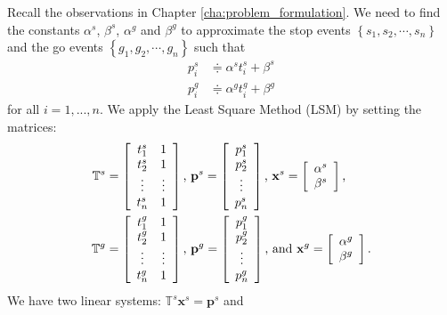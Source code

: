 \documentclass[final,oneside,onecolumn,12pt,a4paper]{book}%
\begin{document}
Recall the observations in Chapter \ref{cha:problem_formulation}. We need to
find the constants $\alpha^{s}$, $\beta^{s}$, $\alpha^{g}$ and $\beta^{g}$ to
approximate the stop events $\left\{  s_{1},s_{2},\cdots,s_{n}\right\}  $ and
the go events $\left\{  g_{1},g_{2},\cdots,g_{n}\right\}  $ such that%
\begin{align*}
p_{i}^{s}  &  \doteqdot\alpha^{s}t_{i}^{s}+\beta^{s}\\
p_{i}^{g}  &  \doteqdot\alpha^{g}t_{i}^{g}+\beta^{g}%
\end{align*}
for all $i=1,...,n$. We apply the Least Square Method (LSM) by setting the
matrices:
\begin{align*}
\mathbb{T}^{s}  &  =\left[
\begin{array}
[c]{cc}%
t_{1}^{s} & 1\\
t_{2}^{s} & 1\\
\vdots & \vdots\\
t_{n}^{s} & 1
\end{array}
\right]  \text{, }\mathbf{p}^{s}=\left[
\begin{array}
[c]{c}%
p_{1}^{s}\\
p_{2}^{s}\\
\vdots\\
p_{n}^{s}%
\end{array}
\right]  \text{, }\mathbf{x}^{s}=\left[
\begin{array}
[c]{c}%
\alpha^{s}\\
\beta^{s}%
\end{array}
\right]  \text{,}\\
\mathbb{T}^{g}  &  =\left[
\begin{array}
[c]{cc}%
t_{1}^{g} & 1\\
t_{2}^{g} & 1\\
\vdots & \vdots\\
t_{n}^{g} & 1
\end{array}
\right]  \text{, }\mathbf{p}^{g}=\left[
\begin{array}
[c]{c}%
p_{1}^{g}\\
p_{2}^{g}\\
\vdots\\
p_{n}^{g}%
\end{array}
\right]  \text{, and }\mathbf{x}^{g}=\left[
\begin{array}
[c]{c}%
\alpha^{g}\\
\beta^{g}%
\end{array}
\right]  \text{.}%
\end{align*}
We have two linear systems: $\mathbb{T}^{s}\mathbf{x}^{s}=\mathbf{p}^{s}$ and
\end{document}
